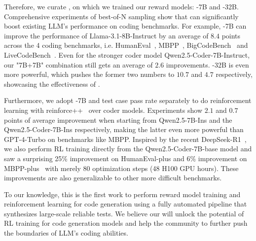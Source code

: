 Therefore, we curate \dataset{}, on which we trained our reward models: \RM-7B and \RM-32B. Comprehensive experiments of best-of-N sampling show that \RM can significantly boost existing LLM's performance on coding benchmarks. For example, \RM-7B can improve the performance of Llama-3.1-8B-Instruct by an average of $8.4$ points across the 4 coding benchmarks, i.e. HumanEval~\citep{evalplus}, MBPP~\citep{evalplus}, BigCodeBench~\citep{zhuo2024bigcodebench} and LiveCodeBench~\citep{jain2024livecodebench}. Even for the stronger coder model Qwen2.5-Coder-7B-Instruct, our "7B+7B" combination still gets an average of $2.6$ improvements. \RM-32B is even more powerful, which pushes the former two numbers to $10.7$ and $4.7$ respectively, showcasing the effectiveness of \RM.

Furthermore, we adopt \RM-7B and test case pass rate separately to do reinforcement learning with reinforce++~\citep{reinforce++} over coder models. Experiments show $2.1$ and $0.7$ points of average improvement when starting from Qwen2.5-7B-Ins and the Qwen2.5-Coder-7B-Ins respectively, making the latter even more powerful than GPT-4-Turbo on benchmarks like MBPP. Inspired by the recent DeepSeek-R1~\citep{DeepseekR1}, we also perform RL training directly from the Qwen2.5-Coder-7B-base model and saw a surprising 25\% improvement on HumanEval-plus and 6\% improvement on MBPP-plus~\citep{evalplus} with merely 80 optimization steps (48 H100 GPU hours). These improvements are also generalizable to other more difficult benchmarks. 


To our knowledge, this is the first work to perform reward model training and reinforcement learning for code generation using a fully automated pipeline that synthesizes large-scale reliable tests.
We believe our \dataset{} will unlock the potential of RL training for code generation models and help the community to further push the boundaries of LLM's coding abilities.